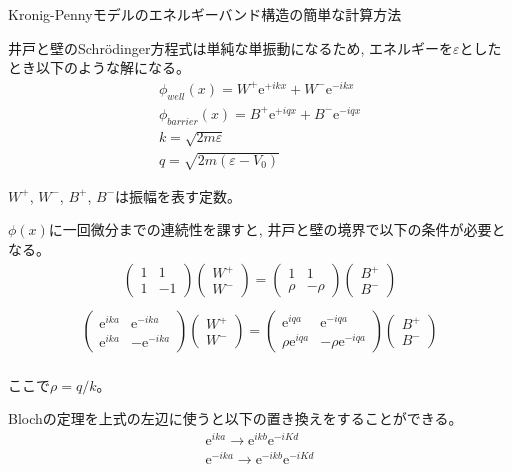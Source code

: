 \documentclass[a4paper, lualatex]{bxjsarticle}
\begin{document}
\begin{section}{Kronig-Pennyモデルのエネルギーバンド構造の簡単な計算方法\label{AppK}}
    \par 井戸と壁のSchrödinger方程式は単純な単振動になるため, エネルギーを$\varepsilon$としたとき以下のような解になる。
    \begin{align}
     \phi_{well}(x)=W^+\mathrm{e}^{+ikx}+W^-\mathrm{e}^{-ikx}\nonumber\\
        \phi_{barrier}(x)=B^+\mathrm{e}^{+iqx}+B^-\mathrm{e}^{-iqx}\nonumber\\
        k=\sqrt{2m\varepsilon}\nonumber\\
        q=\sqrt{2m(\varepsilon - V_0)}
    \end{align}
    \par $W^+$, $W^-$, $B^+$, $B^-$は振幅を表す定数。
    \par $\phi(x)$に一回微分までの連続性を課すと, 井戸と壁の境界で以下の条件が必要となる。
    \begin{align}
     \begin{pmatrix} 1 & 1 \\ 1 & -1 \end{pmatrix}\begin{pmatrix} W^{ + } \\ W^{ - } \end{pmatrix}=\begin{pmatrix} 1 & 1 \\ \rho & -\rho \end{pmatrix}\begin{pmatrix} B^{ + } \\ B^{ - } \end{pmatrix}\nonumber\\
    \end{align}
    \begin{align}
     \begin{pmatrix} \mathrm{e}^{ika} & \mathrm{e}^{-ika} \\ \mathrm{e}^{ika} & -\mathrm{e}^{-ika} \end{pmatrix}\begin{pmatrix} W^{+} \\ W^{-} \end{pmatrix}=\begin{pmatrix} \mathrm{e}^{iqa} & \mathrm{e}^{-iqa} \\ \rho\mathrm{e}^{iqa} & -\rho \mathrm{e}^{-iqa} \end{pmatrix}\begin{pmatrix} B^{+} \\ B^{-} \end{pmatrix}\nonumber\\
    \end{align}
    \par ここで$\rho=q/k$。
    \par Blochの定理を上式の左辺に使うと以下の置き換えをすることができる。
    \begin{align}
        \mathrm{e}^{ika}\rightarrow\mathrm{e}^{ikb}\mathrm{e}^{-iKd}\\
        \mathrm{e}^{-ika}\rightarrow\mathrm{e}^{-ikb}\mathrm{e}^{-iKd}
    \end{align}
    \end{section}
\end{document}

